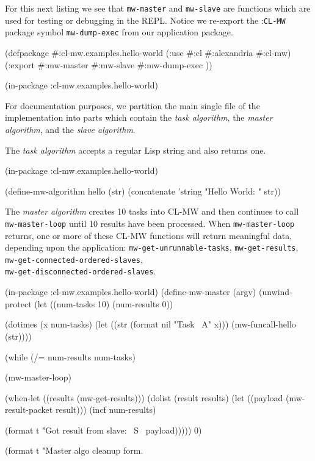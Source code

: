 \documentclass[titlepage,12pt]{book}
\newcommand{\xsmall}{\latexhtml{\small}{}}
\newcommand{\xnormalsize}{\latexhtml{\normalsize}{}}
\newcommand{\clmw}{\xsmall\textsc{CL-MW}\xnormalsize\xspace}
\newcommand{\package}[1]{\mbox{:\uppercase{\xsmall\texttt{#1}\xnormalsize}} package\xspace}
\newcommand{\mwpackage}{\package{CL-MW}}
\newcommand{\sa}{\textit{slave algorithm}\xspace}
\newcommand{\ma}{\textit{master algorithm}\xspace}
\newcommand{\ta}{\textit{task algorithm}\xspace}
\newcommand{\func}[1]{\mbox{\texttt{#1}}\xspace}
\newcommand{\file}[1]{\texttt{#1}\xspace}
\newcommand{\bold}[1]{\textbf{#1}\xspace}
\begin{document}
For this next listing we see that \func{mw-master} and \func{mw-slave}
are functions which are used for testing or debugging in the
REPL. Notice we re-export the \mwpackage symbol \func{mw-dump-exec}
from our application package.

\begin{lisp}[caption=\file{package.lisp}]
(defpackage #:cl-mw.examples.hello-world
  (:use #:cl #:alexandria #:cl-mw)
  (:export #:mw-master
           #:mw-slave
           #:mw-dump-exec ))

(in-package :cl-mw.examples.hello-world)
\end{lisp}

For documentation purposes, we partition the main single file of the
implementation into parts which contain the \ta, the \ma, and the \sa.

The \ta accepts a regular Lisp string and also returns one.

\begin{lisp}[caption=\file{hello-world.lisp: \bold{Part 1 of 4}}]
(in-package :cl-mw.examples.hello-world)

(define-mw-algorithm hello (str)
  (concatenate 'string "Hello World: " str))
\end{lisp}

The \ma creates 10 tasks into \clmw and then continues
to call \func{mw-master-loop} until 10 results have been
processed.  When \func{mw-master-loop} returns, one or
more of these \clmw functions will return meaningful data,
depending upon the application: \func{mw-get-unrunnable-tasks},
\func{mw-get-results}, \func{mw-get-connected-ordered-slaves},\\
\func{mw-get-disconnected-ordered-slaves}.

\begin{lisp}[caption=\file{hello-world.lisp: \bold{Part 2 of 4}}]
(in-package :cl-mw.examples.hello-world)
(define-mw-master (argv)
    (unwind-protect
         (let ((num-tasks 10)
               (num-results 0))

           (dotimes (x num-tasks)
             (let ((str (format nil "Task ~A" x)))
               (mw-funcall-hello (str))))

           (while (/= num-results num-tasks)

             (mw-master-loop)

             (when-let ((results (mw-get-results)))
               (dolist (result results)
                 (let ((payload (mw-result-packet result)))
                   (incf num-results)

                   (format t "Got result from slave: ~S~%
                           payload)))))
           0)

      (format t "Master algo cleanup form.~%
\end{lisp}
\end{document}
